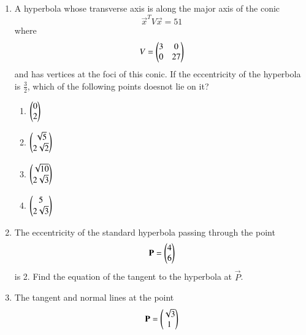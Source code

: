 \documentclass[journal,12pt,twocolumn]{IEEEtran}
\begin{document}
\begin{enumerate}[label=\arabic*.]
\item A hyperbola whose transverse axis is along the major axis of the conic
\begin{equation}
\vec{x}^TV\vec{x} =51
\end{equation}
%
where
\begin{equation}
V = \begin{pmatrix}3 & 0 \\ 0 & 27\end{pmatrix}
\end{equation}
and has vertices at the foci of this conic.  If the eccentricity of the hyperbola is $\frac{3}{2}$, which of 
the following points doesnot lie on it?
\begin{enumerate}
\item $\begin{pmatrix} 0 \\ 2\end{pmatrix}$
\item $\begin{pmatrix}\sqrt{5}  \\ 2\sqrt{2}\end{pmatrix}$
\item $\begin{pmatrix}\sqrt{10}  \\ 2\sqrt{3}\end{pmatrix}$
\item $\begin{pmatrix}5 \\ 2\sqrt{3}\end{pmatrix}$
\end{enumerate}
\item The eccentricity of the standard hyperbola passing through the point 
\begin{equation}
\mathbf{P}= \begin{pmatrix}4 \\ 6\end{pmatrix}
\end{equation}
is 2.  Find the equation of the tangent to the hyperbola at $\vec{P}$.
\item The tangent and normal lines at the point 
\begin{equation}
\vec{P}= \myvec{\sqrt{3} \\ 1}

\end{equation}
\end{enumerate}
\end{document}

